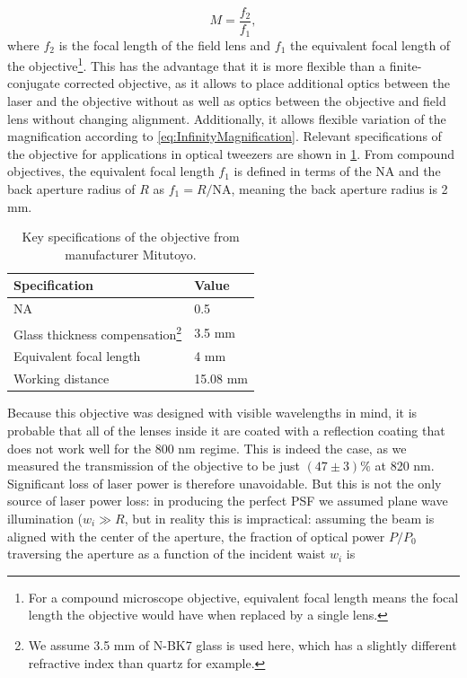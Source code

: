 \begin{equation}\label{eq:InfinityMagnification}
    M = \frac{f_2}{f_1},
\end{equation}
where $f_2$ is the focal length of the field lens and $f_1$ the equivalent focal length of the objective\footnote{For a compound microscope objective, equivalent focal length means the focal length the objective would have when replaced by a single lens.}.
This has the advantage that it is more flexible than a finite-conjugate corrected objective, as it allows to place additional optics between the laser and the objective without as well as optics between the objective and field lens without changing alignment.
Additionally, it allows flexible variation of the magnification according to \cref{eq:InfinityMagnification}.
Relevant specifications of the objective for applications in optical tweezers are shown in \cref{table:MitutoyoSpecs}. 
From compound objectives, the equivalent focal length $f_1$ is defined in terms of the \ac{NA} and the back aperture radius of $R$ as $f_1 = R / \text{NA}$, meaning the back aperture radius is 2 mm.

\begin{table}[h]
    \centering
    \caption{Key specifications of the objective from manufacturer Mitutoyo.}
    \label{table:MitutoyoSpecs}
    \begin{tabular}{l | l}
        \textbf{Specification}       & \textbf{Value} \\ \hline 
        NA                           & 0.5            \\ \hline
        Glass thickness compensation\footnote{We assume 3.5 mm of N-BK7 glass is used here, which has a slightly different refractive index than quartz for example.} & 3.5 mm         \\ \hline
        Equivalent focal length      & 4 mm           \\ \hline
        Working distance             & 15.08 mm      
    \end{tabular}
\end{table}
\noindent Because this objective was designed with visible wavelengths in mind, it is probable that all of the lenses inside it are coated with a reflection coating that does not work well for the 800 nm regime. 
This is indeed the case, as we measured the transmission of the objective to be just $(47 \pm 3)\%$ at 820 nm. 
Significant loss of laser power is therefore unavoidable.
But this is not the only source of laser power loss: in producing the perfect \ac{PSF} we assumed plane wave illumination ($w_i \gg R$, but in reality this is impractical: assuming the beam is aligned with the center of the aperture, the fraction of optical power $P/P_0$ traversing the aperture as a function of the incident waist $w_i$ is

